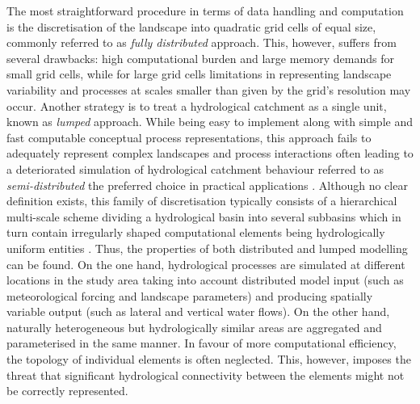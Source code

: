 The most straightforward procedure in terms of data handling and computation is the discretisation of the landscape into quadratic grid cells of equal size, commonly referred to as \emph{fully distributed} approach.
This, however, suffers from several drawbacks:
high computational burden and large memory demands for small grid cells, while for large grid cells limitations in representing landscape variability and processes at scales smaller than given by the grid's resolution may occur.
Another strategy is to treat a hydrological catchment as a single unit, known as \emph{lumped} approach.
While being easy to implement along with simple and fast computable conceptual process representations, this approach fails to adequately represent complex landscapes and process interactions often leading to a deteriorated simulation of hydrological catchment behaviour \DIFdelbegin {}\DIFdelend \DIFaddbegin {}\DIFaddend referred to as \emph{semi-distributed} \DIFdelbegin {}\DIFdelend \DIFaddbegin {}\DIFaddend the preferred choice in practical applications \citep[e.g.,][]{Kumar2010, Euser2015}.
Although no clear definition exists, this family of discretisation typically consists of a hierarchical multi-scale scheme dividing a hydrological basin into several subbasins which in turn contain irregularly shaped computational elements being hydrologically uniform entities \citep[e.g.,][]{Krysanova1998}.
Thus, the properties of both distributed and lumped modelling can be found\DIFaddbegin {}\DIFaddend .
On the one hand, hydrological processes are simulated at different locations in the study area taking into account distributed model input (such as meteorological forcing and landscape parameters) and producing spatially variable output (such as lateral and vertical water flows).
On the other hand, naturally heterogeneous but hydrologically similar areas are aggregated and parameterised in the same manner.
\DIFaddbegin {}\DIFaddend In favour of more computational efficiency, the topology of individual elements is often neglected.
This, however, imposes the threat that significant hydrological connectivity between the elements might not be correctly represented.

